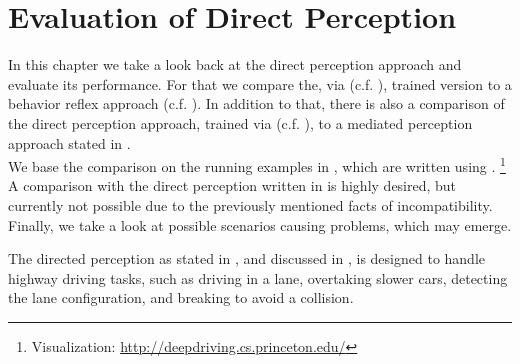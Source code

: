 \chapter{Evaluation of Direct Perception}

In this chapter we take a look back at the direct perception approach and evaluate its performance. For that we compare the, via \torcs (c.f. ), trained version to a behavior reflex approach (c.f. ). In addition to that, there is also a comparison of the direct perception approach, trained via \kitti (c.f. ), to a mediated perception approach stated in \cite{geiger20143d}.\\
We base the comparison on the running examples in \cite{DeepDriving}, which are written using \caffe. \footnote{Visualization: \url{http://deepdriving.cs.princeton.edu/}}\\
A comparison with the direct perception written in \cnnarch is highly desired, but currently not possible due to the previously mentioned facts of incompatibility.\\
Finally, we take a look at possible scenarios causing problems, which may emerge. 

The directed perception as stated in \cite{chen2015deepdriving}, and discussed in , is designed to handle highway driving tasks, such as driving in a lane, overtaking slower cars, detecting the lane configuration, and breaking to avoid a collision.

